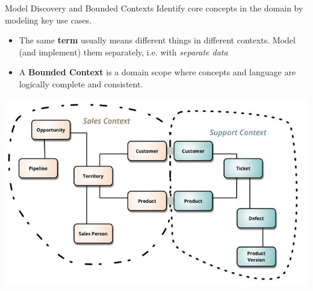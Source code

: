 \begin{frame}{Model Discovery and Bounded Contexts}
Identify core concepts in the domain by modeling key use cases. 
\begin{itemize}
    \item The same \textbf{term} usually means different things in different contexts. Model (and implement) them separately, i.e. with \textit{separate data}
    \item A \textbf{Bounded Context} is a domain scope where concepts and language are logically complete and consistent.
\end{itemize}
\vfill
\centerline{
    \includegraphics[height=0.5\textheight]{../MicroServiceDesign/images/MicroServiceDesign}
}
\end{frame}


